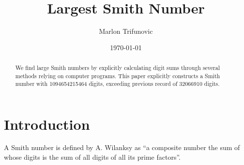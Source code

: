 \documentclass{amsart}
\numberwithin{equation}{section}
\theoremstyle{plain} %
\theoremstyle{definition}
\theoremstyle{remark}
\begin{document}
\title{Largest Smith Number}


\author{Marlon Trifunovic}

\address{}






\date{\today}

 \begin{abstract}
We find large Smith numbers by explicitly calculating digit sums through several methods relying on computer programs. This paper explicitly constructs a Smith number with \num{1094654215464} digits, exceeding previous record of \num{32066910} digits.
 \end{abstract}


\maketitle

 \tableofcontents


 \section{Introduction}

A Smith number is defined by A. Wilanksy as ``a composite number the sum of whose digits is the sum of all digits of all its prime factors''\cite{Wilansky1982}.
\end{document}
